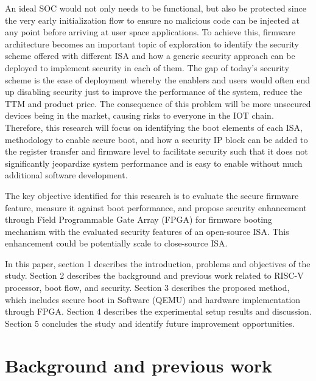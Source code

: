 \documentclass[]{rsos}%
\begin{document}
An ideal SOC would not only needs to be functional, but also be protected since the very early
initialization flow to ensure no malicious code can be injected at any point before arriving at
user space applications. To achieve this, firmware architecture becomes an important topic
of exploration to identify the security scheme offered with different ISA and how a generic
security approach can be deployed to implement security in each of them. The gap of today’s
security scheme is the ease of deployment whereby the enablers and users would often end up
disabling security just to improve the performance of the system, reduce the TTM and product price.
The consequence of this problem will be more unsecured devices being in the market,
causing risks to everyone in the IOT chain. Therefore, this research will focus on identifying the
boot elements of each ISA, methodology to enable secure boot, and how a security IP block
can be added to the register transfer and firmware level to facilitate security such that it
does not significantly jeopardize system performance and is easy to enable without much
additional software development.

The key objective identified for this research is to
evaluate the secure firmware feature, measure it against boot performance, and propose
security enhancement through Field Programmable Gate Array (FPGA) for firmware booting
mechanism with the evaluated security features of an open-source ISA. This enhancement
could be potentially scale to close-source ISA.

In this paper, section 1 describes the introduction, problems and objectives of the study.
Section 2 describes the background and previous work related to RISC-V processor, boot flow, and
security. Section 3 describes the proposed method, which includes secure boot in Software (QEMU)
and hardware implementation through FPGA. Section 4 describes the experimental setup results and
discussion. Section 5 concludes the study and identify future improvement opportunities.

\section{ Background and previous work}
\end{document}

